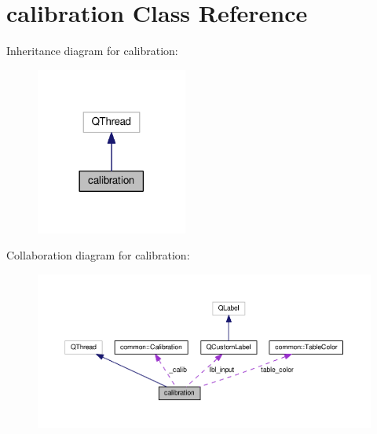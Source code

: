 \hypertarget{classcalibration}{}\section{calibration Class Reference}
\label{classcalibration}


Inheritance diagram for calibration\+:\nopagebreak
\begin{figure}[H]
\begin{center}
\leavevmode
\includegraphics[width=141pt]{classcalibration__inherit__graph}
\end{center}
\end{figure}


Collaboration diagram for calibration\+:\nopagebreak
\begin{figure}[H]
\begin{center}
\leavevmode
\includegraphics[width=350pt]{classcalibration__coll__graph}
\end{center}
\end{figure}
